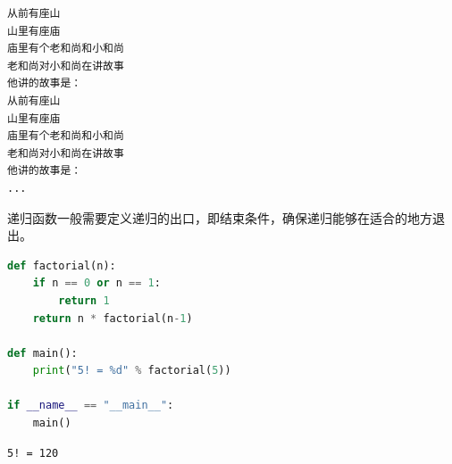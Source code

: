 \begin{tcolorbox}
	\begin{verbatim}
从前有座山
山里有座庙
庙里有个老和尚和小和尚
老和尚对小和尚在讲故事
他讲的故事是：
从前有座山
山里有座庙
庙里有个老和尚和小和尚
老和尚对小和尚在讲故事
他讲的故事是：
...
\end{verbatim}
\end{tcolorbox}

递归函数一般需要定义递归的出口，即结束条件，确保递归能够在适合的地方退出。\\


\begin{lstlisting}[language=Python]
def factorial(n):
	if n == 0 or n == 1:
		return 1
	return n * factorial(n-1)

def main():
	print("5! = %d" % factorial(5))

if __name__ == "__main__":
	main()
\end{lstlisting}

\begin{tcolorbox}
	\begin{verbatim}
5! = 120
\end{verbatim}
\end{tcolorbox}

